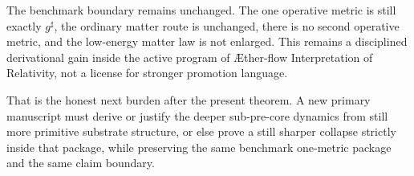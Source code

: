 \documentclass[11pt]{article}
\newcommand{\Aflow}{\AE{}ther-flow}
\newcommand{\TheoryName}{\Aflow{} Interpretation of Relativity}
\newcommand{\CompletedMetric}{g^{\sharp}}
\begin{document}
The benchmark boundary remains unchanged. The one operative metric is still exactly \(\CompletedMetric\), the ordinary matter route is unchanged, there is no second operative metric, and the low-energy matter law is not enlarged. This remains a disciplined derivational gain inside the active program of \TheoryName{}, not a license for stronger promotion language.

That is the honest next burden after the present theorem. A new primary manuscript must derive or justify the deeper sub-pre-core dynamics from still more primitive substrate structure, or else prove a still sharper collapse strictly inside that package, while preserving the same benchmark one-metric package and the same claim boundary.
\end{document}
